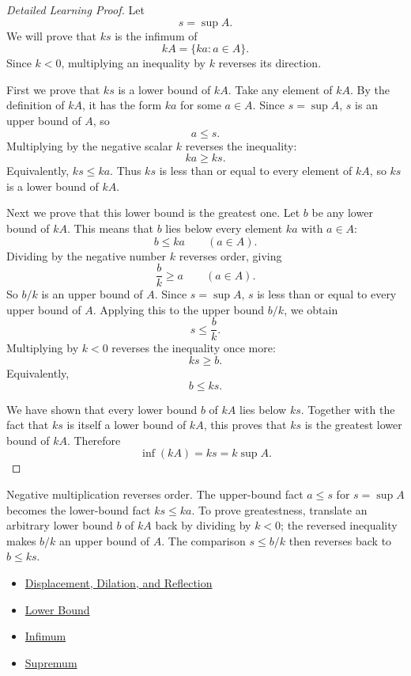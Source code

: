 \begin{proof}[Detailed Learning Proof]
\LRAProofBodyStart
Let
\[
  s=\sup A.
\]
We will prove that \(ks\) is the infimum of
\[
  kA=\{ka:a\in A\}.
\]
Since \(k<0\), multiplying an inequality by \(k\) reverses its direction.

First we prove that \(ks\) is a lower bound of \(kA\). Take any element of
\(kA\). By the definition of \(kA\), it has the form \(ka\) for some
\(a\in A\). Since \(s=\sup A\), \(s\) is an upper bound of \(A\), so
\[
  a\le s.
\]
Multiplying by the negative scalar \(k\) reverses the inequality:
\[
  ka\ge ks.
\]
Equivalently, \(ks\le ka\). Thus \(ks\) is less than or equal to every element
of \(kA\), so \(ks\) is a lower bound of \(kA\).

Next we prove that this lower bound is the greatest one. Let \(b\) be any
lower bound of \(kA\). This means that \(b\) lies below every element \(ka\)
with \(a\in A\):
\[
  b\le ka
  \qquad(a\in A).
\]
Dividing by the negative number \(k\) reverses order, giving
\[
  \frac{b}{k}\ge a
  \qquad(a\in A).
\]
So \(b/k\) is an upper bound of \(A\). Since \(s=\sup A\), \(s\) is less than
or equal to every upper bound of \(A\). Applying this to the upper bound
\(b/k\), we obtain
\[
  s\le \frac{b}{k}.
\]
Multiplying by \(k<0\) reverses the inequality once more:
\[
  ks\ge b.
\]
Equivalently,
\[
  b\le ks.
\]

We have shown that every lower bound \(b\) of \(kA\) lies below \(ks\).
Together with the fact that \(ks\) is itself a lower bound of \(kA\), this
proves that \(ks\) is the greatest lower bound of \(kA\). Therefore
\[
  \inf(kA)=ks=k\sup A.
\]
\end{proof}

\begin{remark*}
Negative multiplication reverses order. The upper-bound fact \(a\le s\) for
\(s=\sup A\) becomes the lower-bound fact \(ks\le ka\). To prove greatestness,
translate an arbitrary lower bound \(b\) of \(kA\) back by dividing by
\(k<0\); the reversed inequality makes \(b/k\) an upper bound of \(A\). The
comparison \(s\le b/k\) then reverses back to \(b\le ks\).
\end{remark*}

\begin{dependencies}
\begin{itemize}
  \item \hyperref[def:displacement-dilation-reflection]{Displacement, Dilation, and Reflection}
  \item \hyperref[def:real-lower-bound]{Lower Bound}
  \item \hyperref[def:infimum]{Infimum}
  \item \hyperref[def:supremum]{Supremum}
\end{itemize}
\end{dependencies}

\clearpage
